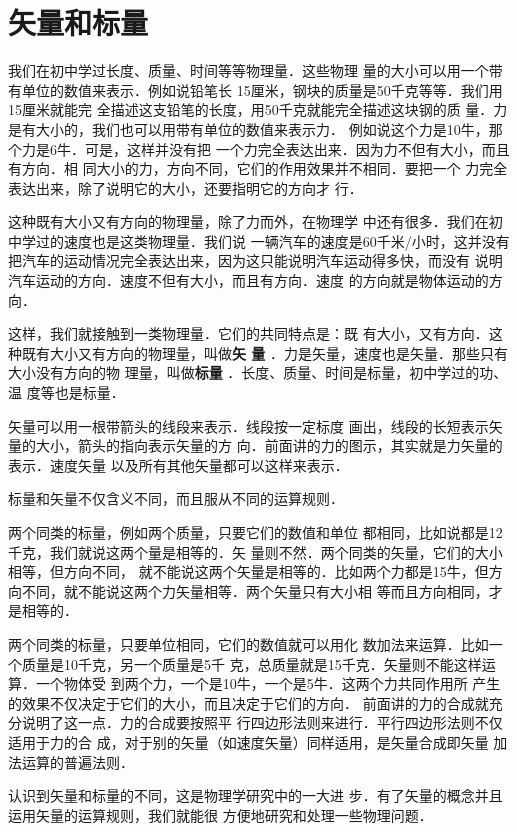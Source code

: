 \section{矢量和标量} 
    我们在初中学过长度、质量、时间等等物理量．这些物理
量的大小可以用一个带有单位的数值来表示．例如说铅笔长
15厘米，钢块的质量是50千克等等．我们用15厘米就能完
全描述这支铅笔的长度，用50千克就能完全描述这块钢的质
量．力是有大小的，我们也可以用带有单位的数值来表示力．
例如说这个力是10牛，那个力是6牛．可是，这样并没有把
一个力完全表达出来．因为力不但有大小，而且有方向．相
同大小的力，方向不同，它们的作用效果并不相同．要把一个
力完全表达出来，除了说明它的大小，还要指明它的方向才
行．

    这种既有大小又有方向的物理量，除了力而外，在物理学
中还有很多．我们在初中学过的速度也是这类物理量．我们说
一辆汽车的速度是60千米/小时，这并没有把汽车的运动情况完全表达出来，因为这只能说明汽车运动得多快，而没有
说明汽车运动的方向．速度不但有大小，而且有方向．速度
的方向就是物体运动的方向．

    这样，我们就接触到一类物理量．它们的共同特点是：既
有大小，又有方向．这种既有大小又有方向的物理量，叫做\textbf{矢
量} ．力是矢量，速度也是矢量．那些只有大小没有方向的物
理量，叫做\textbf{标量} ．长度、质量、时间是标量，初中学过的功、温
度等也是标量．

    矢量可以用一根带箭头的线段来表示．线段按一定标度
画出，线段的长短表示矢量的大小，箭头的指向表示矢量的方
向．前面讲的力的图示，其实就是力矢量的表示．速度矢量
以及所有其他矢量都可以这样来表示．

    标量和矢量不仅含义不同，而且服从不同的运算规则．

    两个同类的标量，例如两个质量，只要它们的数值和单位
都相同，比如说都是12千克，我们就说这两个量是相等的．矢
量则不然．两个同类的矢量，它们的大小相等，但方向不同，
就不能说这两个矢量是相等的．比如两个力都是15牛，但方
向不同，就不能说这两个力矢量相等．两个矢量只有大小相
等而且方向相同，才是相等的．

    两个同类的标量，只要单位相同，它们的数值就可以用化
数加法来运算．比如一个质量是10千克，另一个质量是5千
克，总质量就是15千克．矢量则不能这样运算．一个物体受
到两个力，一个是10牛，一个是5牛．这两个力共同作用所
产生的效果不仅决定于它们的大小，而且决定于它们的方向．
前面讲的力的合成就充分说明了这一点．力的合成要按照平
行四边形法则来进行．平行四边形法则不仅适用于力的合
成，对于别的矢量（如速度矢量）同样适用，是矢量合成即矢量
加法运算的普遍法则．

    认识到矢量和标量的不同，这是物理学研究中的一大进
步．有了矢量的概念并且运用矢量的运算规则，我们就能很
方便地研究和处理一些物理问题．

